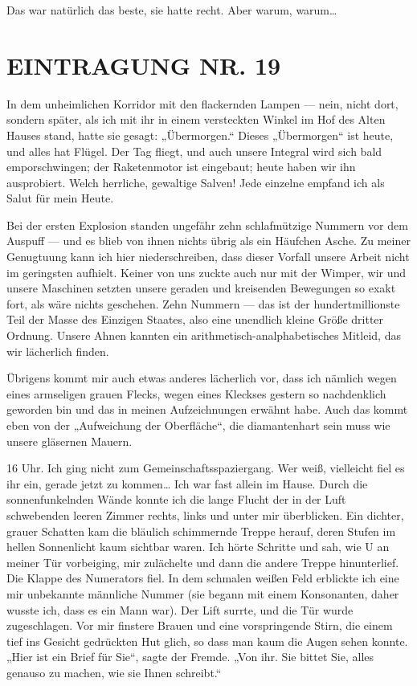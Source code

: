 Das war natürlich das beste, sie hatte recht. Aber warum, warum\ldots{}

\section{EINTRAGUNG NR. 19}

In dem unheimlichen Korridor mit den flackernden Lampen — nein,
nicht dort, sondern später, als ich mit ihr in einem versteckten
Winkel im Hof des Alten Hauses stand, hatte sie gesagt:
„Übermorgen.“ Dieses „Übermorgen“ ist heute, und alles hat Flügel.
Der Tag fliegt, und auch unsere Integral wird sich bald
emporschwingen; der Raketenmotor ist eingebaut; heute haben wir ihn
ausprobiert. Welch herrliche, gewaltige Salven! Jede einzelne
empfand ich als Salut für mein Heute.

Bei der ersten Explosion standen ungefähr zehn schlafmützige
Nummern vor dem Auspuff — und es blieb von ihnen nichts übrig als
ein Häufchen Asche. Zu meiner Genugtuung kann ich hier
niederschreiben, dass dieser Vorfall unsere Arbeit nicht im
geringsten aufhielt. Keiner von uns zuckte auch nur mit der Wimper,
wir und unsere Maschinen setzten unsere geraden und kreisenden
Bewegungen so exakt fort, als wäre nichts geschehen. Zehn Nummern —
das ist der hundertmillionste Teil der Masse des Einzigen Staates,
also eine unendlich kleine Größe dritter Ordnung. Unsere Ahnen
kannten ein arithmetisch-analphabetisches Mitleid, das wir
lächerlich finden.

Übrigens kommt mir auch etwas anderes lächerlich vor, dass ich
nämlich wegen eines armseligen grauen Flecks, wegen eines Kleckses
gestern so nachdenklich geworden bin und das in meinen
Aufzeichnungen erwähnt habe. Auch das kommt eben von der
„Aufweichung der Oberfläche“, die diamantenhart sein muss wie
unsere gläsernen Mauern.

16 Uhr. Ich ging nicht zum Gemeinschaftsspaziergang. Wer weiß,
vielleicht fiel es ihr ein, gerade jetzt zu kommen\ldots{} Ich war fast
allein im Hause. Durch die sonnenfunkelnden Wände konnte ich die
lange Flucht der in der Luft schwebenden leeren Zimmer rechts,
links und unter mir überblicken. Ein dichter, grauer Schatten kam
die bläulich schimmernde Treppe herauf, deren Stufen im hellen
Sonnenlicht kaum sichtbar waren. Ich hörte Schritte und sah, wie U
an meiner Tür vorbeiging, mir zulächelte und dann die andere Treppe
hinunterlief. Die Klappe des Numerators fiel. In dem schmalen
weißen Feld erblickte ich eine mir unbekannte männliche Nummer (sie
begann mit einem Konsonanten, daher wusste ich, dass es ein Mann
war). Der Lift surrte, und die Tür wurde zugeschlagen. Vor mir
finstere Brauen und eine vorspringende Stirn, die einem tief ins
Gesicht gedrückten Hut glich, so dass man kaum die Augen sehen
konnte. „Hier ist ein Brief für Sie“, sagte der Fremde. „Von ihr.
Sie bittet Sie, alles genauso zu machen, wie sie Ihnen schreibt.“

